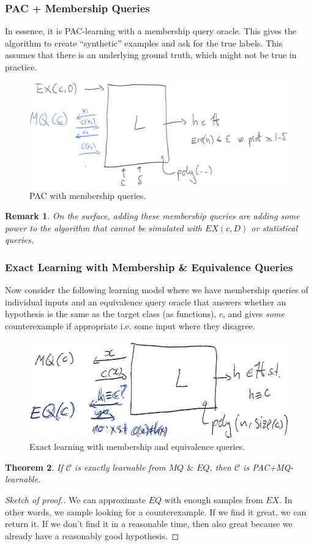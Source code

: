 \documentclass[12pt, letterpaper]{article}
\numberwithin{equation}{section} %
\newcommand{\mc}{\mathcal}
\newtheorem{theorem}{Theorem}[section]
\newtheorem{remark}[theorem]{Remark}
\theoremstyle{definition}
\theoremstyle{remark}
\begin{document}
\subsubsection*{PAC + Membership Queries}
In essence, it is PAC-learning with a membership query oracle. This gives the algorithm to create ``synthetic'' examples and ask for the true labels. This assumes that there is an underlying ground truth, which might not be true in practice.
\begin{figure}[H]
\centering
\includegraphics[width=0.6\linewidth]{../img/pac-mq.png}
\caption{PAC with membership queries.}
\end{figure}
\begin{remark}
On the surface, adding these membership queries are adding some power to the algorithm that cannot be simulated with $EX(c, D)$ or statistical queries.
\end{remark}
\subsubsection*{Exact Learning with Membership \& Equivalence Queries}
Now consider the following learning model where we have membership queries of individual inputs and an equivalence query oracle that answers whether an hypothesis is the same as the target class (as functions), $c$, and gives \emph{some} counterexample if appropriate i.e. some input where they disagree.
\begin{figure}[H]
\centering
\includegraphics[width=0.6\linewidth]{../img/pac-mq-eq.png}
\caption{Exact learning with membership and equivalence queries.}
\end{figure}

\begin{theorem}
If $\mc C$ is exactly learnable from $MQ$ $\&$ $EQ$, then $\mc C$ is PAC+MQ-learnable.
\end{theorem}
\begin{proof}[Sketch of proof.]
We can approximate $EQ$ with enough samples from $EX$. In other words, we sample looking for a counterexample. If we find it great, we can return it. If we don't find it in a reasonable time, then also great because we already have a reasonably good hypothesis.
\end{proof}
\end{document}
